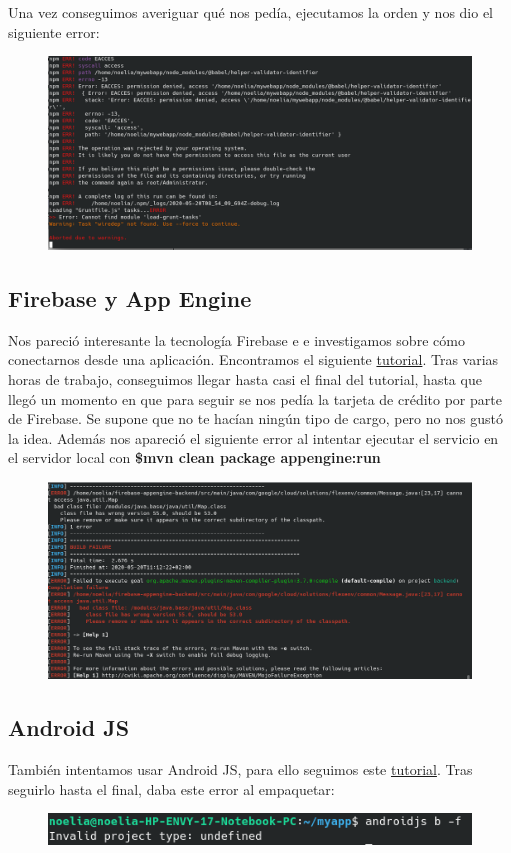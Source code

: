 \documentclass{article}
\begin{document}
 	Una vez conseguimos averiguar qué nos pedía, ejecutamos la orden y nos dio el siguiente error:
 	
 	\begin{figure}[H]
 		\centering
 		\includegraphics[totalheight=5.5cm]{img/2.png}
 	\end{figure}
 	\subsection{Firebase y App Engine}
 	Nos pareció interesante la tecnología Firebase e
 	e investigamos sobre cómo conectarnos desde una aplicación. Encontramos el siguiente \href{https://cloud.google.com/solutions/mobile/mobile-firebase-app-engine-flexible}{tutorial}. Tras varias horas de trabajo, conseguimos llegar hasta casi el final del tutorial, hasta que llegó un momento en que para seguir se nos pedía la tarjeta de crédito por parte de Firebase. Se supone que no te hacían ningún tipo de cargo, pero no nos gustó la idea. Además nos apareció el siguiente error al intentar ejecutar el servicio en el servidor local con {\bf \$mvn clean package appengine:run}
 	\begin{figure}[H]
 		\centering
 		\includegraphics[totalheight=5.7cm]{img/3.png}
 	\end{figure}
 	\subsection{Android JS}
 	También intentamos usar Android JS, para ello seguimos este \href{https://blog.usejournal.com/how-to-build-android-apps-with-node-js-using-android-js-2aa4643be87b}{tutorial}. Tras seguirlo hasta el final, daba este error al empaquetar:
 	\begin{figure}[H]
 		\centering
 		\includegraphics[totalheight=0.92cm]{img/4.png}
 	\end{figure}
\end{document}
